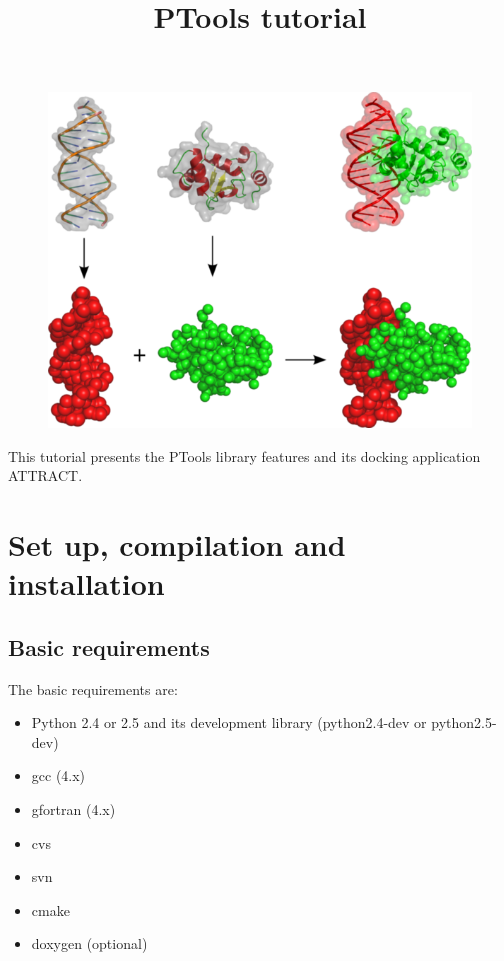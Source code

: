 \documentclass[12pt,a4paper]{article}
\begin{document}
\title{PTools tutorial}
\maketitle

\thispagestyle{empty}

\begin{figure}[htbp]
\center
\includegraphics*[width=0.80\linewidth]{img/docking.png}
\end{figure}


\vspace*{3cm}

\noindent
This tutorial presents the PTools library features and its docking application ATTRACT.

\newpage

\tableofcontents{}

\newpage

\section{Set up, compilation and installation}

\subsection{Basic requirements}

The basic requirements are:
\begin{itemize}
\item Python 2.4 or 2.5 and its development library (python2.4-dev or python2.5-dev)
\item gcc (4.x)
\item gfortran (4.x)
\item cvs
\item svn
\item cmake
\item doxygen (optional)
\end{itemize}
\end{document}
